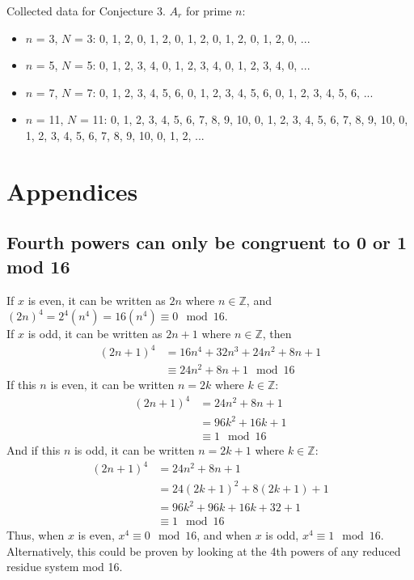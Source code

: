 \documentclass{article}
\begin{document}
\begin{flushleft}
    \vspace{.1in}

    Collected data for Conjecture 3. $A_r$ for prime $n$:
    \begin{itemize}
        \item $n$ = 3, $N$ = 3:  0, 1, 2, 0, 1, 2, 0, 1, 2, 0, 1, 2, 0, 1, 2, 0, ...
        \item $n$ = 5, $N$ = 5:  0, 1, 2, 3, 4, 0, 1, 2, 3, 4, 0, 1, 2, 3, 4, 0, ...
        \item $n$ = 7, $N$ = 7:  0, 1, 2, 3, 4, 5, 6, 0, 1, 2, 3, 4, 5, 6, 0, 1, 2, 3, 4, 5, 6, ...
        \item $n$ = 11, $N$ = 11:  0, 1, 2, 3, 4, 5, 6, 7, 8, 9, 10, 0, 1, 2, 3, 4, 5, 6, 7, 8, 9, 10, 0, 1, 2, 3, 4, 5, 6, 7, 8, 9, 10, 0, 1, 2, ...
    \end{itemize}

\newpage

\section{Appendices}
\subsection{Fourth powers can only be congruent to 0 or 1 mod 16}
If $x$ is even, it can be written as $2n$ where $n \in \mathbb{Z}$, and $(2n)^4=2^4(n^4)=16(n^4) \equiv 0 \mod 16$. \\
If $x$ is odd, it can be written as $2n+1$ where $n \in \mathbb{Z}$, then 
\begin{align*}
    (2n+1)^4 &= 16n^4 + 32n^3 + 24n^2 + 8n + 1 \\
    &\equiv 24n^2+8n+1 \mod 16
\end{align*}
If this $n$ is even, it can be written $n=2k$ where $k \in \mathbb{Z}$:
\begin{align*}
    (2n+1)^4 &= 24n^2+8n+1 \\
    &= 96k^2 + 16k + 1 \\
    &\equiv 1 \mod 16
\end{align*}
And if this $n$ is odd, it can be written  $n=2k+1$ where $k \in \mathbb{Z}$: 
\begin{align*}
    (2n+1)^4 &= 24n^2 + 8n + 1 \\
    &= 24(2k+1)^2 + 8(2k+1) + 1 \\
    &= 96k^2 + 96k + 16k + 32 + 1\\
    &\equiv 1 \mod 16
\end{align*}
Thus, when $x$ is even, $x^4 \equiv 0 \mod 16$, and when $x$ is odd, $x^4 \equiv 1 \mod 16$. \\
Alternatively, this could be proven by looking at the 4th powers of any reduced residue system mod 16. 


\end{flushleft}
\end{document}
